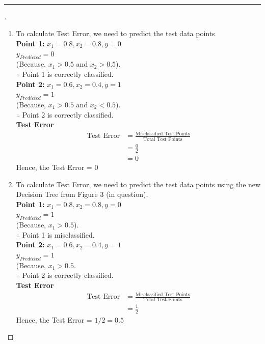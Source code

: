 \documentclass[a4paper, 12pt]{article}
\title{\course \; \assignmentName}
\author{\textbf{\assignmentAuthor} \\ \Small{USC ID - \USCID}}
\date{\assignmentDate}
\begin{document}
\thispagestyle{plain}
\maketitle
\hrule
\bigskip


\begin{proof}[]

\hfill

\begin{enumerate}[label={\color{blue}{\textbf{1.\arabic*})}}]
    \item 
        To calculate Test Error, we need to predict the test data points\\
        \textbf{Point 1:} $x_1 = 0.8, x_2 = 0.8, y = 0$ \\
        $y_{Predicted} = 0$ \\
        (Because, $x_1 > 0.5$ and $x_2 > 0.5$). \\
        $\therefore$ Point 1 is correctly classified. \\
        \textbf{Point 2:} $x_1 = 0.6, x_2 = 0.4, y = 1$ \\
        $y_{Predicted} = 1$ \\
        (Because, $x_1 > 0.5$ and $x_2 < 0.5$). \\
        $\therefore$ Point 2 is correctly classified. \\
        \textbf{Test Error}
        \begin{align*}
            \text{Test Error} &= \frac{\text{Misclassified Test Points}}{\text{Total Test Points}} \\
            &= \frac{0}{2} \\
            &= 0
        \end{align*} 
        Hence, the Test Error = 0
        
    \item 
        To calculate Test Error, we need to predict the test data points using the new Decision Tree from Figure 3 (in question). \\
        \textbf{Point 1:} $x_1 = 0.8, x_2 = 0.8, y = 0$ \\
        $y_{Predicted} = 1$ \\
        (Because, $x_1 > 0.5$). \\
        $\therefore$ Point 1 is misclassified. \\
        \textbf{Point 2:} $x_1 = 0.6, x_2 = 0.4, y = 1$ \\
        $y_{Predicted} = 1$ \\
        (Because, $x_1 > 0.5$. \\
        $\therefore$ Point 2 is correctly classified. \\
        \textbf{Test Error}
        \begin{align*}
            \text{Test Error} &= \frac{\text{Misclassified Test Points}}{\text{Total Test Points}} \\
            &= \frac{1}{2}
        \end{align*} 
        Hence, the Test Error = $1/2 = 0.5$
        

\end{enumerate}
\end{proof}
\end{document}

